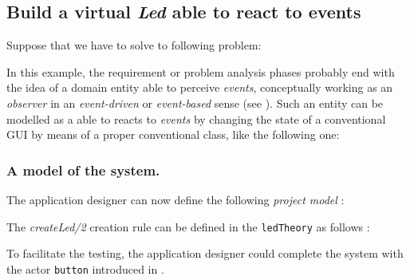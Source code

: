 

\subsection{Build a virtual \textit{Led} able to react to events}
Suppose that we have to solve to following problem:

\medskip 
\scriptsize
{}
\normalsize
\medskip    


In this example, the requirement or problem analysis phases probably end with the idea of a domain entity able to perceive \textit{events}, conceptually working as an \textit{observer} in an \textit{event-driven} or \textit{event-based} sense (see ). Such an entity can be modelled as a \qa{} able to reacts to \textit{events} by changing the state of a conventional GUI by means of a proper conventional \java{} class, like the following one: 



\subsubsection{A \qa{} model of the system.}
The application designer can now define the following  \textit{project model}  :

  

The \textit{createLed/2} creation rule can be defined in the \texttt{ledTheory} as follows :

 

To facilitate the testing, the application designer could complete the system with the actor \texttt{button} introduced in .  

